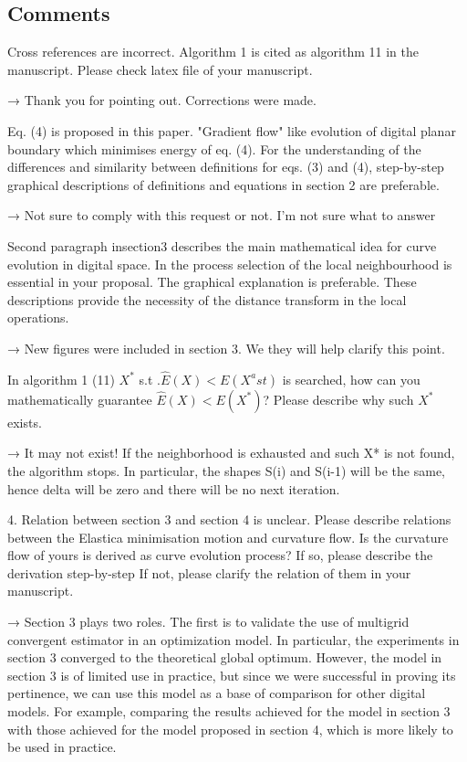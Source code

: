 \documentclass[12pt]{article}
\begin{document}
\subsection{Comments}

Cross references are incorrect. Algorithm 1 is cited as algorithm 11 in the manuscript.
Please check latex file of your manuscript.

→ Thank you for pointing out. Corrections were made.


Eq. (4) is proposed in this paper.
"Gradient flow" like evolution of digital planar boundary which minimises energy of eq. (4).
For the understanding of the differences and similarity between definitions for eqs. (3) and (4),
step-by-step graphical descriptions of definitions and equations in section 2 are preferable.

→ Not sure to comply with this request or not. I’m not sure what to answer


Second paragraph insection3 describes the main mathematical idea for curve evolution in digital space. In the process selection of the local neighbourhood is essential in your proposal. The graphical explanation is preferable. These descriptions provide the necessity of the distance transform in the local operations.

→ New figures were included in section 3. We they will help clarify this point.


In algorithm 1 (11) $X^\ast$ s.t .$\hat{E}(X)< E(X^ast)$ is searched, how can you mathematically guarantee $\hat{E}(X)< E(X^\ast)$? Please describe why such $X^{\ast}$ exists.

→ It may not exist! If the neighborhood is exhausted and such X* is not found, the algorithm stops. In particular, the shapes S(i) and S(i-1) will be the same, hence delta will be zero and there will be no next iteration.



4. Relation between section 3 and section 4 is unclear.
Please describe relations between the Elastica minimisation motion and curvature flow.
Is the curvature flow of yours is derived as curve evolution process?
If so, please describe the derivation step-by-step
If not, please clarify the relation of them in your manuscript.

→ Section 3 plays two roles. The first is to validate the use of multigrid convergent estimator in an optimization model. In particular, the experiments in section 3 converged to the theoretical global optimum. However, the model in section 3 is of limited use in practice, but since we were successful in proving its pertinence, we can use this model as a base of comparison for other digital models. For example, comparing the results achieved for the model in section 3 with those achieved for the model proposed in section 4, which is more likely to be used in practice.
\end{document}
